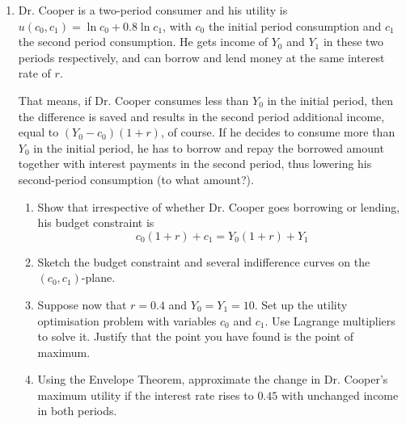 \documentclass[12pt]{article} %
\theoremstyle{definition} %
\begin{document}
\begin{enumerate}[resume]
\item Dr. Cooper is a two-period consumer and his utility is $u(c_0 , c_1) = \ln c_0 + 0.8 \ln c_1$, with $c_0$ the initial period consumption and $c_1$ the second period consumption. He gets income of $Y_0$ and $Y_1$ in these two periods respectively, and can borrow and lend money at the same interest rate of $r$.


That means, if Dr. Cooper consumes less than $Y_0$ in the initial period, then the difference is saved and results in the second period additional income, equal to $(Y_0 - c_0)(1 + r)$, of course. If he decides to consume more than $Y_0$ in the initial period, he has to borrow and repay the borrowed amount together with interest payments in the second period, thus lowering his second-period consumption (to what amount?).
\begin{enumerate}
\item Show that irrespective of whether Dr. Cooper goes borrowing or lending, his budget
constraint is
\[
c_0 (1 + r) + c_1 = Y_0 (1 + r) + Y_1
\]
\item Sketch the budget constraint and several indifference curves on the $(c_0 , c_1)$-plane.
\item Suppose now that $r = 0.4$ and $Y_0 = Y_1 = 10$. Set up the utility optimisation problem with variables $c_0$ and $c_1$. Use Lagrange multipliers to solve it. Justify that the point you have found is the point of maximum.
\item Using the Envelope Theorem, approximate the change in Dr. Cooper’s maximum
utility if the interest rate rises to $0.45$ with unchanged income in both periods.
\end{enumerate}


\end{enumerate}
\end{document}
